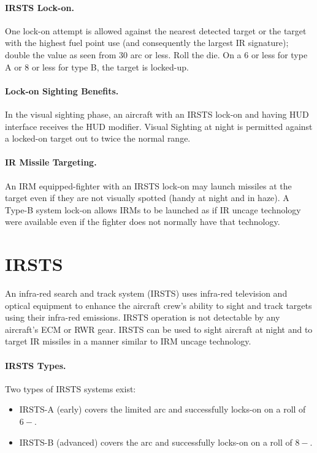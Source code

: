 \begin{advancedrules}
{\paragraph{IRSTS Lock-on.} One lock-on attempt is allowed against the nearest detected target or the target with the highest fuel point use (and consequently the largest IR signature); double the value as seen from 30{\deg} arc or less. Roll the die. On a 6 or less for type A or 8 or less for type B, the target is locked-up.

\paragraph{Lock-on Sighting Benefits.} In the visual sighting phase, an aircraft with an IRSTS lock-on and having HUD interface receives the HUD modifier. Visual Sighting at night is permitted against a locked-on target out to twice the normal range.

\paragraph{IR Missile Targeting.} An IRM equipped-fighter with an IRSTS lock-on may launch missiles at the target even if they are not visually spotted (handy at night and in haze).  A Type-B system lock-on allows IRMs to be launched as if IR uncage technology were available even if the fighter does not normally have that technology.
}{

\section{IRSTS}
\label{rule:irsts}

An infra-red search and track system (IRSTS) uses infra-red television and optical equipment to enhance the aircraft crew’s ability to sight and track targets using their infra-red emissions. IRSTS operation is not detectable by any aircraft’s ECM or RWR gear. IRSTS can be used to sight aircraft at night and to target IR missiles in a manner similar to IRM uncage technology.

\paragraph{IRSTS Types.} Two types of IRSTS systems exist: 
\begin{itemize}
    \item IRSTS-A (early) covers the limited arc and successfully locks-on on a roll of $6-$.
    \item IRSTS-B (advanced) covers the  arc and successfully locks-on on a roll of $8-$.
\end{itemize}

}
\end{advancedrules}

